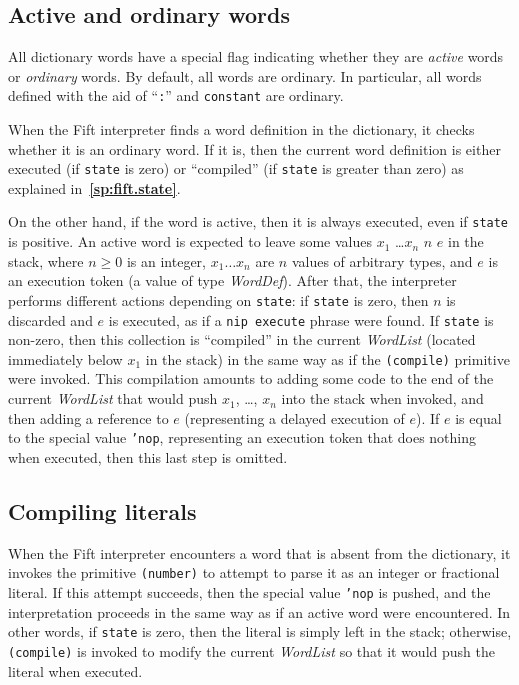 \documentclass[12pt,oneside]{article}
\def\refpoint#1{{\rm\textbf{\ref{#1}}}}
\let\ptref=\refpoint
\def\mysubsection#1{\subsection{#1}\fancyhead[C]{\small{\textsc{\textrm{\thesubsection.} #1}}}}
\begin{document}
\mysubsection{Active and ordinary words}\label{p:active.words}
All dictionary words have a special flag indicating whether they are {\em active\/} words or {\em ordinary\/} words. By default, all words are ordinary. In particular, all words defined with the aid of ``{\tt :}'' and {\tt constant} are ordinary.

When the Fift interpreter finds a word definition in the dictionary, it checks whether it is an ordinary word. If it is, then the current word definition is either executed (if {\tt state} is zero) or ``compiled'' (if {\tt state} is greater than zero) as explained in~\ptref{sp:fift.state}.

On the other hand, if the word is active, then it is always executed, even if {\tt state} is positive. An active word is expected to leave some values $x_1$ \dots $x_n$ $n$ $e$ in the stack, where $n\geq 0$ is an integer, $x_1\dots x_n$ are $n$ values of arbitrary types, and $e$ is an execution token (a value of type {\em WordDef\/}). After that, the interpreter performs different actions depending on {\tt state}: if {\tt state} is zero, then $n$ is discarded and $e$ is executed, as if a {\tt nip execute} phrase were found. If {\tt state} is non-zero, then this collection is ``compiled'' in the current {\em WordList} (located immediately below $x_1$ in the stack) in the same way as if the {\tt (compile)} primitive were invoked. This compilation amounts to adding some code to the end of the current {\em WordList\/} that would push $x_1$, \dots, $x_n$ into the stack when invoked, and then adding a reference to $e$ (representing a delayed execution of $e$). If $e$ is equal to the special value {\tt 'nop}, representing an execution token that does nothing when executed, then this last step is omitted.

\mysubsection{Compiling literals}
When the Fift interpreter encounters a word that is absent from the dictionary, it invokes the primitive {\tt (number)} to attempt to parse it as an integer or fractional literal. If this attempt succeeds, then the special value {\tt 'nop} is pushed, and the interpretation proceeds in the same way as if an active word were encountered. In other words, if {\tt state} is zero, then the literal is simply left in the stack; otherwise, {\tt (compile)} is invoked to modify the current {\em WordList\/} so that it would push the literal when executed.
\end{document}
